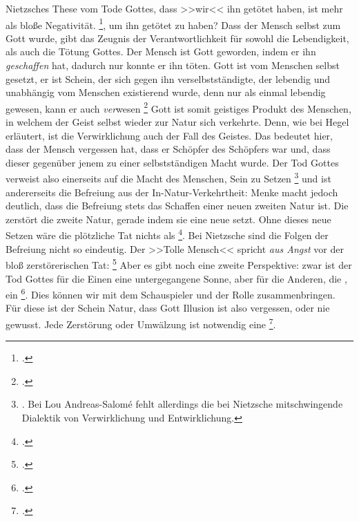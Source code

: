 \documentclass[12pt, a4paper, openany]{report}
\begin{document}
Nietzsches These vom Tode Gottes, dass >>wir<< ihn getötet haben, ist mehr als bloße Negativität. 
\footcite[][481]{nietzsche_morgenrote_1999}, um ihn getötet zu haben?
Dass der Mensch selbst zum Gott wurde, gibt das Zeugnis der Verantwortlichkeit für sowohl die Lebendigkeit, als auch die Tötung Gottes.
Der Mensch ist Gott geworden, indem er ihn \emph{geschaffen} hat, dadurch nur konnte er ihn töten. 
Gott ist vom Menschen selbst gesetzt, er ist Schein, der sich gegen ihn verselbstständigte, der lebendig und unabhängig vom Menschen existierend wurde, denn nur als einmal lebendig gewesen, kann er auch \emph{ver}wesen \footcite[][481]{nietzsche_morgenrote_1999}
Gott ist somit geistiges Produkt des Menschen, in welchem der Geist selbst wieder zur Natur sich verkehrte.
Denn, wie bei Hegel erläutert, ist die Verwirklichung auch der Fall des Geistes.
Das bedeutet hier, dass der Mensch vergessen hat, dass er Schöpfer des Schöpfers war und, dass dieser gegenüber jenem zu einer selbstständigen Macht wurde.
Der Tod Gottes verweist also einerseits auf die Macht des Menschen, Sein zu Setzen%
\footnote{
    . 
    Bei Lou Andreas-Salomé fehlt allerdings die bei Nietzsche mitschwingende Dialektik von Verwirklichung und Entwirklichung.
} 
und ist andererseits die Befreiung aus der In-Natur-Verkehrtheit:
Menke macht jedoch deutlich, dass die Befreiung stets das Schaffen einer neuen zweiten Natur ist. 
Die  zerstört die  zweite Natur, gerade indem sie eine neue setzt.
Ohne dieses neue Setzen wäre die plötzliche Tat nichts als \footcite[][§ 5 A, S. 39]{hegel_grundlinien_2017}.
Bei Nietzsche sind die Folgen der Befreiung nicht so eindeutig.
Der >>Tolle Mensch<< spricht \emph{aus Angst} vor der bloß zerstörerischen Tat: \footcite[][481]{nietzsche_morgenrote_1999}
Aber es gibt noch eine zweite Perspektive: 
zwar ist der Tod Gottes für die Einen eine untergegangene Sonne, aber für die Anderen, die , ein \footcite[][S. 573 - S. 574]{nietzsche_morgenrote_1999}.
Dies können wir mit dem Schauspieler und der Rolle zusammenbringen. 
Für diese ist der Schein Natur, dass Gott Illusion ist also vergessen, oder nie gewusst. Jede Zerstörung oder Umwälzung ist notwendig eine \footcite[][573]{nietzsche_morgenrote_1999}.
\end{document}
